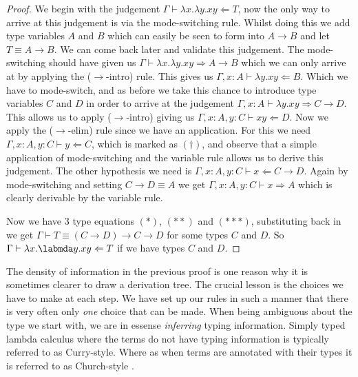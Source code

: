 \begin{example}
\begin{example}
    \begin{proof}
        We begin with the judgement $\Gamma \vdash \lambda x . \lambda y . x y \Leftarrow T$, now the only way to arrive at this judgement is via the mode-switching rule.
        Whilst doing this we add type variables $A$ and $B$ which can easily be seen to form into $A \to B$ and let $T \equiv A \to B$.
        We can come back later and validate this judgement.
        The mode-switching should have given us $\Gamma \vdash \lambda x . \lambda y . x y \Rightarrow A \to B$ which we can only arrive at by applying the ($\to$-intro) rule. This gives us $\Gamma , x : A \vdash \lambda y . xy \Leftarrow B$.
        Which we have to mode-switch, and as before we take this chance to introduce type variables $C$ and $D$ in order to arrive at the judgement $\Gamma , x : A \vdash \lambda y . x y \Rightarrow C \to D$.
        This allows us to apply ($\to$-intro) giving us $\Gamma , x : A , y : C \vdash xy \Leftarrow D$.
        Now we apply the ($\to$-elim) rule since we have an application.
        For this we need $\Gamma , x : A, y : C \vdash y \Leftarrow C$, which is marked as $(\dagger)$, and observe that a simple application of mode-switching and the variable rule allows us to derive this judgement.
        The other hypothesis we need is $\Gamma , x : A, y : C \vdash x \Leftarrow C \to D$.
        Again by mode-switching and setting $C \to D \equiv A$ we get $\Gamma , x : A, y : C \vdash x \Rightarrow A$ which is clearly derivable by the variable rule.
            
        Now we have 3 type equations $(*)$, $(**)$ and $(***)$, substituting back in we get $\Gamma \vdash T \equiv (C \to D) \to C \to D$ for some types $C$ and $D$. So $\Gamma \vdash \lambda x . \labmda y . x y \Leftarrow T$ if we have types $C$ and $D$.
    \end{proof}
\end{example}

\begin{remark}
    The density of information in the previous proof is one reason why it is sometimes clearer to draw a derivation tree. The crucial lesson is the choices we have to make at each step. We have set up our rules in such a manner that there is very often only \emph{one} choice that can be made. When being ambiguous about the type we start with, we are in essense \emph{inferring} typing information. Simply typed lambda calculus where the terms do not have typing information is typically referred to as Curry-style. Where as when terms are annotated with their types it is referred to as Church-style \cite{Sorensen}.
\end{remark}


\end{example}
